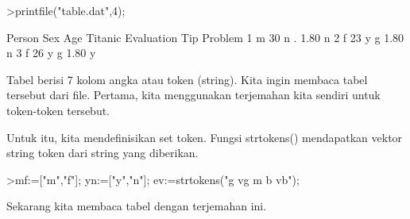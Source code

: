 \documentclass[a4paper,10pt]{article}
\begin{document}
\begin{eulernotebook}
\begin{eulercomment}
\begin{eulercomment}
\begin{eulercomment}
\begin{eulercomment}
\begin{eulercomment}
\begin{eulercomment}
\begin{eulercomment}
\begin{eulercomment}
\begin{eulercomment}
\begin{eulercomment}
\begin{eulercomment}
\begin{eulercomment}
\begin{eulercomment}
\begin{eulercomment}
\begin{eulercomment}
\begin{eulercomment}
\begin{eulercomment}
\begin{eulercomment}
\begin{eulercomment}
\begin{eulercomment}
\begin{eulercomment}
\begin{eulercomment}
\begin{eulercomment}
\begin{eulercomment}
\begin{eulercomment}
\begin{eulercomment}
\begin{eulercomment}
\begin{eulercomment}
\begin{eulercomment}
\begin{eulercomment}
\begin{eulercomment}
\begin{eulercomment}
\begin{eulercomment}
\begin{eulercomment}
\begin{eulercomment}
\begin{eulercomment}
\begin{eulercomment}
\begin{eulercomment}
\begin{eulercomment}
\begin{eulercomment}
\begin{eulercomment}
\begin{eulercomment}
\begin{eulercomment}
\begin{eulercomment}
\begin{eulerprompt}
>printfile("table.dat",4);
\end{eulerprompt}
\begin{euleroutput}
  Person Sex Age Titanic Evaluation Tip Problem
  1 m 30 n . 1.80 n
  2 f 23 y g 1.80 n
  3 f 26 y g 1.80 y
\end{euleroutput}
\begin{eulercomment}
Tabel berisi 7 kolom angka atau token (string). Kita ingin membaca
tabel tersebut dari file. Pertama, kita menggunakan terjemahan kita
sendiri untuk token-token tersebut.

Untuk itu, kita mendefinisikan set token. Fungsi strtokens()
mendapatkan vektor string token dari string yang diberikan.
\end{eulercomment}
\begin{eulerprompt}
>mf:=["m","f"]; yn:=["y","n"]; ev:=strtokens("g vg m b vb");
\end{eulerprompt}
\begin{eulercomment}
Sekarang kita membaca tabel dengan terjemahan ini.


\end{eulercomment}
\end{eulercomment}
\end{eulercomment}
\end{eulercomment}
\end{eulercomment}
\end{eulercomment}
\end{eulercomment}
\end{eulercomment}
\end{eulercomment}
\end{eulercomment}
\end{eulercomment}
\end{eulercomment}
\end{eulercomment}
\end{eulercomment}
\end{eulercomment}
\end{eulercomment}
\end{eulercomment}
\end{eulercomment}
\end{eulercomment}
\end{eulercomment}
\end{eulercomment}
\end{eulercomment}
\end{eulercomment}
\end{eulercomment}
\end{eulercomment}
\end{eulercomment}
\end{eulercomment}
\end{eulercomment}
\end{eulercomment}
\end{eulercomment}
\end{eulercomment}
\end{eulercomment}
\end{eulercomment}
\end{eulercomment}
\end{eulercomment}
\end{eulercomment}
\end{eulercomment}
\end{eulercomment}
\end{eulercomment}
\end{eulercomment}
\end{eulercomment}
\end{eulercomment}
\end{eulercomment}
\end{eulercomment}
\end{eulercomment}
\end{eulernotebook}
\end{document}
